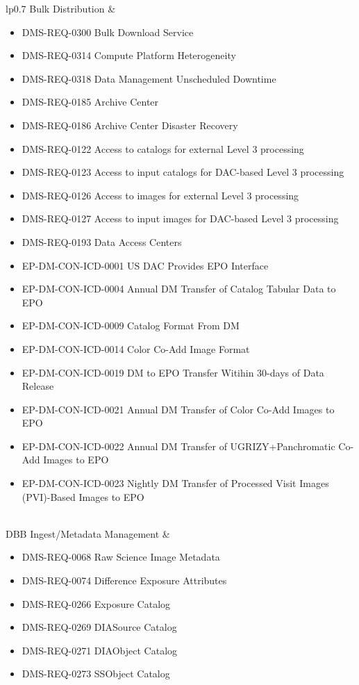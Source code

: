 \begin{xtabular}{lp{0.7\textwidth}}
Bulk Distribution &
\begin{itemize}DMS-REQ-0346 Data Availability
\item DMS-REQ-0300 Bulk Download Service
\item DMS-REQ-0314 Compute Platform Heterogeneity
\item DMS-REQ-0318 Data Management Unscheduled Downtime
\item DMS-REQ-0185 Archive Center
\item DMS-REQ-0186 Archive Center Disaster Recovery
\item DMS-REQ-0122 Access to catalogs for external Level 3 processing
\item DMS-REQ-0123 Access to input catalogs for DAC-based Level 3 processing
\item DMS-REQ-0126 Access to images for external Level 3 processing
\item DMS-REQ-0127 Access to input images for DAC-based Level 3 processing
\item DMS-REQ-0193 Data Access Centers
\item EP-DM-CON-ICD-0001 US DAC Provides EPO Interface
\item EP-DM-CON-ICD-0004 Annual DM Transfer of Catalog Tabular Data to EPO
\item EP-DM-CON-ICD-0009 Catalog Format From DM
\item EP-DM-CON-ICD-0014 Color Co-Add Image Format
\item EP-DM-CON-ICD-0019 DM to EPO Transfer Witihin 30-days of Data Release
\item EP-DM-CON-ICD-0021 Annual DM Transfer of Color Co-Add Images to EPO
\item EP-DM-CON-ICD-0022 Annual DM Transfer of UGRIZY+Panchromatic Co-Add Images to EPO
\item EP-DM-CON-ICD-0023 Nightly DM Transfer of Processed Visit Images (PVI)-Based Images to EPO
\end{itemize} \\ \hline
DBB Ingest/Metadata Management &
\begin{itemize}DMS-REQ-0346 Data Availability
\item DMS-REQ-0068 Raw Science Image Metadata
\item DMS-REQ-0074 Difference Exposure Attributes
\item DMS-REQ-0266 Exposure Catalog
\item DMS-REQ-0269 DIASource Catalog
\item DMS-REQ-0271 DIAObject Catalog
\item DMS-REQ-0273 SSObject Catalog

\end{itemize}
\end{xtabular}
